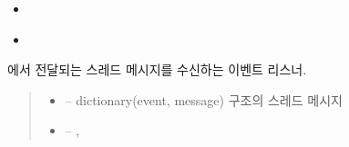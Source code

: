 \documentclass[a4paper,10pt,english]{sphinxmanual}
\begin{document}
\begin{fulllineitems}
\begin{fulllineitems}
\begin{quote}
\begin{description}
\end{description}\end{quote}


\nopagebreak

\begin{itemize}
\item {} 
\sphinxAtStartPar
{\hyperref[\detokenize{_DHSearch:DHSearch._dhDaemonListener}]{}}

\item {} 
\sphinxAtStartPar
{\hyperref[\detokenize{_kademlia:KNode.delete}]{}}

\end{itemize}



\end{fulllineitems}


\begin{fulllineitems}
\label{\detokenize{_DHSearch:DHSearch._dhDaemonListener}}
\pysigstartsignatures
{}
\pysigstopsignatures
\sphinxAtStartPar
{\hyperref[\detokenize{_DHDaemon:dhdaemon}]{}} 에서 전달되는 스레드 메시지를 수신하는 이벤트 리스너.
\begin{quote}\begin{description}
\begin{itemize}
\item {} 
\sphinxAtStartPar
{} – dictionary(event, message) 구조의 스레드 메시지

\item {} 
\sphinxAtStartPar
{} – , 

\end{itemize}

\end{description}\end{quote}



\end{fulllineitems}
\end{fulllineitems}
\end{document}
